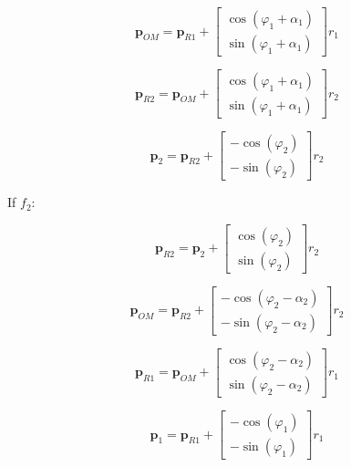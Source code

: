 \documentclass[letterpaper,10pt,conference]{ieeeconf}  %
\begin{document}
\begin{equation}
\bm{p}_{OM} = \bm{p}_{R1} + \begin{bmatrix} 
\cos(\varphi_1 + \alpha_1) \\ 
\sin(\varphi_1 + \alpha_1)
\end{bmatrix} r_1
\end{equation}

\begin{equation}
\bm{p}_{R2} = \bm{p}_{OM} + 
\begin{bmatrix} 
\cos(\varphi_1 + \alpha_1) \\ 
\sin(\varphi_1 + \alpha_1)
\end{bmatrix} r_2
\end{equation}

\begin{equation}
\bm{p}_{2} = \bm{p}_{R2} + 
\begin{bmatrix} 
-\cos(\varphi_2) \\ 
-\sin(\varphi_2)
\end{bmatrix} r_2
\end{equation}



If $f_2$:

\begin{equation}
\bm{p}_{R2} = \bm{p}_{2} + 
\begin{bmatrix} 
\cos(\varphi_2) \\ 
\sin(\varphi_2)
\end{bmatrix} r_2
\end{equation}

\begin{equation}
\bm{p}_{OM} = \bm{p}_{R2} + 
\begin{bmatrix} 
-\cos(\varphi_2-\alpha_2) \\ 
-\sin(\varphi_2-\alpha_2)
\end{bmatrix} r_2
\end{equation}

\begin{equation}
\bm{p}_{R1} = \bm{p}_{OM} + 
\begin{bmatrix} 
\cos(\varphi_2-\alpha_2) \\ 
\sin(\varphi_2-\alpha_2)
\end{bmatrix} r_1
\end{equation}

\begin{equation}
\bm{p}_{1} = \bm{p}_{R1} + 
\begin{bmatrix} 
-\cos(\varphi_1) \\ 
-\sin(\varphi_1)
\end{bmatrix} r_1
\end{equation}
\end{document}

